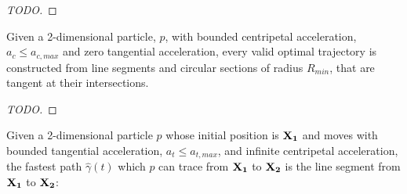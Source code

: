 \begin{proof}
[TODO]
\end{proof}

\begin{corollary}\label{corr:optimal-path-fix-s}
Given a 2-dimensional particle, $p$, with bounded centripetal acceleration, $a_c \le a_{c,max}$ and zero tangential acceleration, every valid optimal trajectory is constructed from line segments and circular sections of radius $R_{min}$, that are tangent at their intersections.
\end{corollary}

\begin{proof}
[TODO]
\end{proof}


\begin{theorem}
  Given a 2-dimensional particle $p$ whose initial position is $\mathbf{X_1}$ and moves with bounded tangential acceleration, $a_t \le a_{t,max}$, and infinite centripetal acceleration, the fastest path $\hat{\gamma}(t)$ which $p$ can trace from $\mathbf{X_1}$ to $\mathbf{X_2}$ is the line segment from $\mathbf{X_1}$ to $\mathbf{X_2}$:
\end{theorem}

